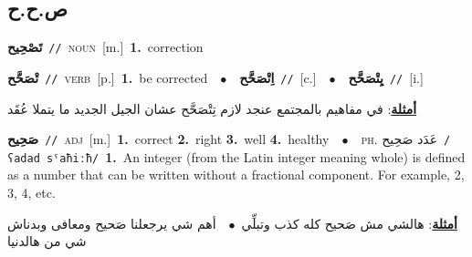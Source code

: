 \documentclass[10pt,a4paper,twoside]{article} %
\begin{document}
\begin{multicols}{2}
\vspace{-3mm}
\subsection*{\color{blue}\foreignlanguage{arabic}{ص.ح.ح}\color{blue}{}} 

{\setlength\topsep{0pt}\textbf{\foreignlanguage{arabic}{تَصْحِيح}}\ {\color{gray}\texttt{//}\color{black}}\ \textsc{noun}\ [m.]\ \textbf{1.}~correction\ } \vspace{2mm}

{\setlength\topsep{0pt}\textbf{\foreignlanguage{arabic}{تْصَحَّح}}\ {\color{gray}\texttt{//}\color{black}}\ \textsc{verb}\ [p.]\ \textbf{1.}~be corrected\ \ $\bullet$\ \ \setlength\topsep{0pt}\textbf{\foreignlanguage{arabic}{اِتْصَحَّح}}\ {\color{gray}\texttt{//}\color{black}}\ [c.]\ \ $\bullet$\ \ \setlength\topsep{0pt}\textbf{\foreignlanguage{arabic}{يِتْصَحَّح}}\ {\color{gray}\texttt{//}\color{black}}\ [i.]\  \begin{flushright}\color{gray}\foreignlanguage{arabic}{\textbf{\underline{\foreignlanguage{arabic}{أمثلة}}}: في مفاهيم بالمجتمع عنجد لازم تِتْصَحَّح عشان الجيل الجديد ما يتملا عُقَد}\end{flushright}\color{black}} \vspace{2mm}

{\setlength\topsep{0pt}\textbf{\foreignlanguage{arabic}{صَحِيح}}\ {\color{gray}\texttt{//}\color{black}}\ \textsc{adj}\ [m.]\ \textbf{1.}~correct  \textbf{2.}~right  \textbf{3.}~well  \textbf{4.}~healthy\ \ $\bullet$\ \ \textsc{ph.} \color{gray} \foreignlanguage{arabic}{عَدَد صَحِيح}\color{black}\ {\color{gray}\texttt{/{\sffamily ʕadad sˤaħiːħ}/}\color{black}}\ \textbf{1.}~An integer (from the Latin integer meaning whole) is defined as a number that can be written without a fractional component. For example, 2, 3, 4, etc.\  \begin{flushright}\color{gray}\foreignlanguage{arabic}{\textbf{\underline{\foreignlanguage{arabic}{أمثلة}}}: هالشي مش صَحيح كله كذب وتبلِّي\ $\bullet$\ \  أهم شي يرجعلنا صَحيح ومعافى وبدناش شي من هالدنيا}\end{flushright}\color{black}} \vspace{2mm}


\end{multicols}
\end{document}
